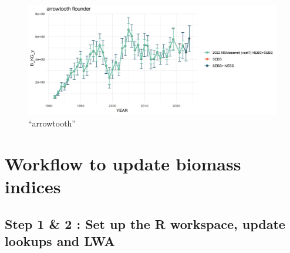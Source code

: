 \documentclass[
]{article}
\begin{document}
\begin{figure}
\centering
\includegraphics{figs/atf_srvy.jpg}
\caption{``arrowtooth''}
\end{figure}

\hypertarget{workflow-to-update-biomass-indices}{%
\section{Workflow to update biomass
indices}\label{workflow-to-update-biomass-indices}}

\hypertarget{step-1-2-set-up-the-r-workspace-update-lookups-and-lwa}{%
\subsection{Step 1 \& 2 : Set up the R workspace, update lookups and
LWA}\label{step-1-2-set-up-the-r-workspace-update-lookups-and-lwa}}
\end{document}
